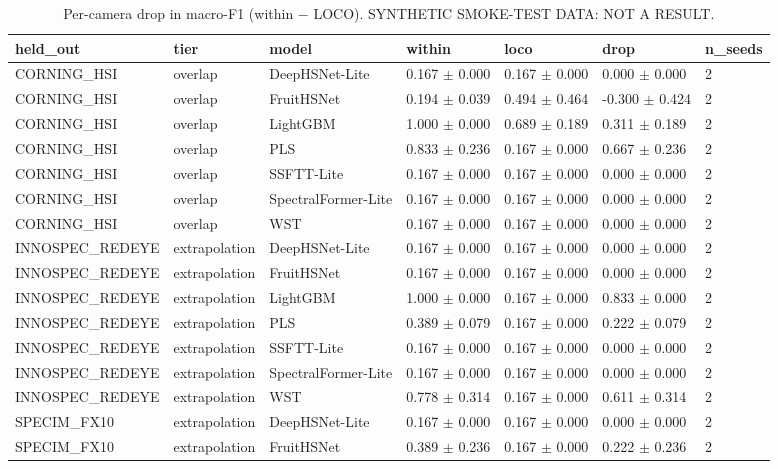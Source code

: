 \begin{table}[t]
\centering
\caption{Per-camera drop in macro-F1 (within − LOCO). SYNTHETIC SMOKE-TEST DATA: NOT A RESULT.}
\label{tab:table_per_camera_drop}
\begin{tabular}{lllllll}
\hline
held\_out & tier & model & within & loco & drop & n\_seeds \\
\hline
CORNING\_HSI & overlap & DeepHSNet-Lite & 0.167 $\pm$ 0.000 & 0.167 $\pm$ 0.000 & 0.000 $\pm$ 0.000 & 2 \\
CORNING\_HSI & overlap & FruitHSNet & 0.194 $\pm$ 0.039 & 0.494 $\pm$ 0.464 & -0.300 $\pm$ 0.424 & 2 \\
CORNING\_HSI & overlap & LightGBM & 1.000 $\pm$ 0.000 & 0.689 $\pm$ 0.189 & 0.311 $\pm$ 0.189 & 2 \\
CORNING\_HSI & overlap & PLS & 0.833 $\pm$ 0.236 & 0.167 $\pm$ 0.000 & 0.667 $\pm$ 0.236 & 2 \\
CORNING\_HSI & overlap & SSFTT-Lite & 0.167 $\pm$ 0.000 & 0.167 $\pm$ 0.000 & 0.000 $\pm$ 0.000 & 2 \\
CORNING\_HSI & overlap & SpectralFormer-Lite & 0.167 $\pm$ 0.000 & 0.167 $\pm$ 0.000 & 0.000 $\pm$ 0.000 & 2 \\
CORNING\_HSI & overlap & WST & 0.167 $\pm$ 0.000 & 0.167 $\pm$ 0.000 & 0.000 $\pm$ 0.000 & 2 \\
INNOSPEC\_REDEYE & extrapolation & DeepHSNet-Lite & 0.167 $\pm$ 0.000 & 0.167 $\pm$ 0.000 & 0.000 $\pm$ 0.000 & 2 \\
INNOSPEC\_REDEYE & extrapolation & FruitHSNet & 0.167 $\pm$ 0.000 & 0.167 $\pm$ 0.000 & 0.000 $\pm$ 0.000 & 2 \\
INNOSPEC\_REDEYE & extrapolation & LightGBM & 1.000 $\pm$ 0.000 & 0.167 $\pm$ 0.000 & 0.833 $\pm$ 0.000 & 2 \\
INNOSPEC\_REDEYE & extrapolation & PLS & 0.389 $\pm$ 0.079 & 0.167 $\pm$ 0.000 & 0.222 $\pm$ 0.079 & 2 \\
INNOSPEC\_REDEYE & extrapolation & SSFTT-Lite & 0.167 $\pm$ 0.000 & 0.167 $\pm$ 0.000 & 0.000 $\pm$ 0.000 & 2 \\
INNOSPEC\_REDEYE & extrapolation & SpectralFormer-Lite & 0.167 $\pm$ 0.000 & 0.167 $\pm$ 0.000 & 0.000 $\pm$ 0.000 & 2 \\
INNOSPEC\_REDEYE & extrapolation & WST & 0.778 $\pm$ 0.314 & 0.167 $\pm$ 0.000 & 0.611 $\pm$ 0.314 & 2 \\
SPECIM\_FX10 & extrapolation & DeepHSNet-Lite & 0.167 $\pm$ 0.000 & 0.167 $\pm$ 0.000 & 0.000 $\pm$ 0.000 & 2 \\
SPECIM\_FX10 & extrapolation & FruitHSNet & 0.389 $\pm$ 0.236 & 0.167 $\pm$ 0.000 & 0.222 $\pm$ 0.236 & 2 \\

\end{tabular}
\end{table}
